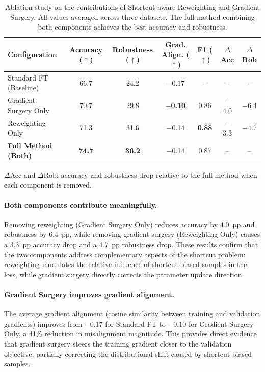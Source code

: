\begin{table}[t]
\centering
\caption{Ablation study on the contributions of Shortcut-aware Reweighting and Gradient Surgery. All values averaged across three datasets. The full method combining both components achieves the best accuracy and robustness.}
\label{tab:ablation}
\small
\begin{tabular}{lcccccc}
\toprule
\textbf{Configuration} & \textbf{Accuracy} ($\uparrow$) & \textbf{Robustness} ($\uparrow$) & \textbf{Grad. Align.} ($\uparrow$) & \textbf{F1} ($\uparrow$) & \textbf{$\Delta$Acc} & \textbf{$\Delta$Rob} \\
\midrule
Standard FT (Baseline)     & 66.7 & 24.2 & $-$0.17 & -- & -- & -- \\
\midrule
Gradient Surgery Only      & 70.7 & 29.8 & \textbf{$-$0.10} & 0.86 & $-$4.0 & $-$6.4 \\
Reweighting Only           & 71.3 & 31.6 & $-$0.14 & \textbf{0.88} & $-$3.3 & $-$4.7 \\
\textbf{Full Method (Both)} & \textbf{74.7} & \textbf{36.2} & $-$0.14 & 0.87 & -- & -- \\
\bottomrule
\end{tabular}

\vspace{4pt}
{\footnotesize $\Delta$Acc and $\Delta$Rob: accuracy and robustness drop relative to the full method when each component is removed.}
\end{table}

\paragraph{Both components contribute meaningfully.}
Removing reweighting (Gradient Surgery Only) reduces accuracy by 4.0~pp and robustness by 6.4~pp, while removing gradient surgery (Reweighting Only) causes a 3.3~pp accuracy drop and a 4.7~pp robustness drop. These results confirm that the two components address complementary aspects of the shortcut problem: reweighting modulates the relative influence of shortcut-biased samples in the loss, while gradient surgery directly corrects the parameter update direction.

\paragraph{Gradient Surgery improves gradient alignment.}
The average gradient alignment (cosine similarity between training and validation gradients) improves from $-0.17$ for Standard FT to $-0.10$ for Gradient Surgery Only, a 41\% reduction in misalignment magnitude. This provides direct evidence that gradient surgery steers the training gradient closer to the validation objective, partially correcting the distributional shift caused by shortcut-biased samples.

